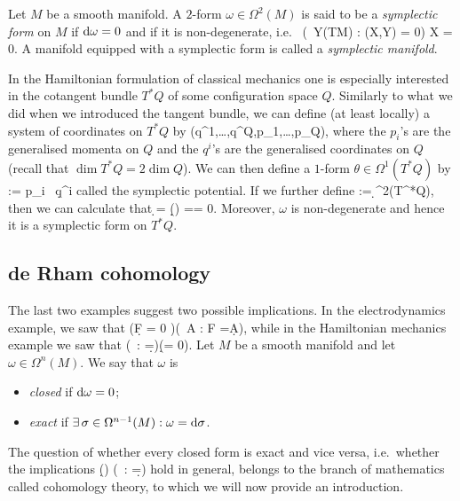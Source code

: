 \bd
Let $M$ be a smooth manifold. A $2$-form $\omega\in\Omega^2(M)$ is said to be a \emph{symplectic form} on $M$ if $\mathrm{d} \omega = 0$ and if it is non-degenerate, i.e.\
\bse
(\forall \, Y\in \Gamma(TM) : \omega(X,Y) = 0) \Rightarrow X = 0.
\ese
A manifold equipped with a symplectic form is called a \emph{symplectic manifold}.
\ed

\be
In the Hamiltonian formulation of classical mechanics one is especially interested in the cotangent bundle $T^*Q$ of some configuration space $Q$. Similarly to what we did when we introduced the tangent bundle, we can define (at least locally) a system of coordinates on $T^*Q$ by
\bse
(q^1,\ldots,q^{\dim Q},p_1,\ldots,p_{\dim Q}),
\ese
where the $p_i$'s are the generalised momenta on $Q$ and the $q^i$'s are the generalised coordinates on $Q$ (recall that $\dim T^*Q=2\dim Q$). We can then define a $1$-form $\theta\in\Omega^1(T^*Q)$ by
\bse
\theta := p_i \, \d q^i
\ese
called the symplectic potential. If we further define
\bse
\omega := \d \theta \in \Omega^2(T^*Q),
\ese
then we can calculate that
\bse
\d \omega = \d (\d \theta) =\cdots = 0.
\ese
Moreover, $\omega$ is non-degenerate and hence it is a symplectic form on $T^*Q$.
\ee

\subsection{de Rham cohomology}


The last two examples suggest two possible implications. In the electrodynamics example, we saw that
\bse
(\d F = 0 )\Rightarrow (\exists \, A : F =\d A),
\ese
while in the Hamiltonian mechanics example we saw that
\bse
(\exists\, \theta : \omega =\d \theta )\Rightarrow (\d \omega = 0).
\ese
\bd
Let $M$ be a smooth manifold and let $\omega \in \Omega^n(M)$. We say that $\omega$ is
\begin{itemize}
\item \emph{closed} if $\mathrm{d} \omega = 0$;
\item \emph{exact} if $\exists \, \sigma \in \Omega^{n-1}(M): \omega = \mathrm{d} \sigma$.
\end{itemize}
\ed
The question of whether every closed form is exact and vice versa, i.e.\ whether the implications 
\bse
(\d {}) \Leftrightarrow (\exists \, \sigma : \omega =\d \sigma)
\ese
hold in general, belongs to the branch of mathematics called cohomology theory, to which we will now provide an introduction.


